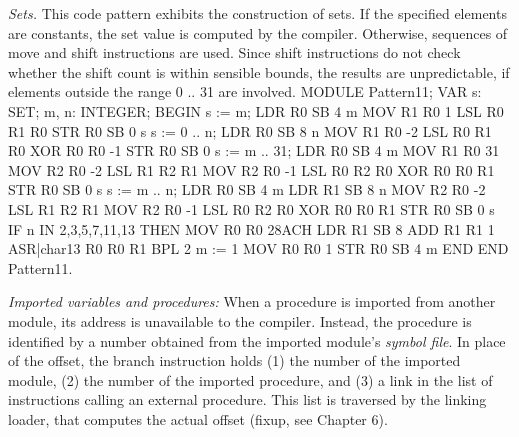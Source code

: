 \noindent {} \emph{Sets.} This code pattern exhibits the construction of sets. If the specified elements are constants, the set value is computed by the compiler. Otherwise, sequences of move and shift instructions are used. Since shift instructions do not check whether the shift count is within sensible bounds, the results are unpredictable, if elements outside the range 0 .. 31 are involved.
\begintt
MODULE Pattern11;
  VAR s: SET; m, n: INTEGER;
BEGIN
  s := {m};                       LDR  R0 SB 4      m
                                  MOV  R1 R0 1
                                  LSL  R0 R1 R0
                                  STR  R0 SB 0      s
  s := {0 .. n};                  LDR  R0 SB 8      n
                                  MOV  R1 R0 -2
                                  LSL  R0 R1 R0
                                  XOR  R0 R0 -1
                                  STR  R0 SB 0
  s := {m .. 31};                 LDR  R0 SB 4      m
                                  MOV  R1 R0 31
                                  MOV  R2 R0 -2
                                  LSL  R1 R2 R1
                                  MOV  R2 R0 -1
                                  LSL  R0 R2 R0
                                  XOR  R0 R0 R1
                                  STR  R0 SB 0      s
  s := {m .. n};                  LDR  R0 SB 4      m
                                  LDR  R1 SB 8      n
                                  MOV  R2 R0 -2
                                  LSL  R1 R2 R1
                                  MOV  R2 R0 -1
                                  LSL  R0 R2 R0
                                  XOR  R0 R0 R1
                                  STR  R0 SB 0      s
  IF n IN {2,3,5,7,11,13} THEN    MOV  R0 R0 28ACH
                                  LDR  R1 SB 8
                                  ADD  R1 R1 1
                                  ASR|char13 R0 R0 R1
                                  BPL 2
  m := 1                          MOV  R0 R0 1
                                  STR  R0 SB 4      m
  END
END Pattern11.   
\endtt

\noindent {} \emph{Imported variables and procedures:} When a procedure is imported from another module, its address is unavailable to the compiler. Instead, the procedure is identified by a number obtained from the imported module's \emph{symbol file}. In place of the offset, the branch instruction holds (1) the number of the imported module, (2) the number of the imported procedure, and (3) a link in the list of  instructions calling an external procedure. This list is traversed by the linking loader, that computes the actual offset (fixup, see Chapter 6).

